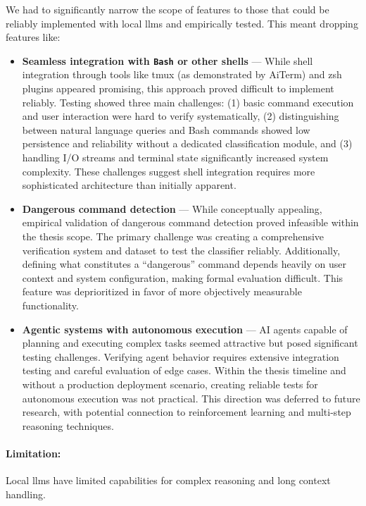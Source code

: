 We had to significantly narrow the scope of features to those that could be
reliably implemented with local \glspl{llm} and empirically tested. This meant
dropping features like:
\begin{itemize}
  \item \textbf{Seamless integration with \texttt{Bash} or other shells} ---
    While shell integration through tools like tmux (as demonstrated by AiTerm)
        and zsh plugins appeared promising, this approach proved difficult to
        implement reliably. Testing showed three main challenges: (1) basic
        command execution and user interaction were hard to verify
        systematically, (2) distinguishing between natural language queries and
        Bash commands showed low persistence and reliability without a dedicated
        classification module, and (3) handling I/O streams and terminal state
        significantly increased system complexity. These challenges suggest
        shell integration requires more sophisticated architecture than
        initially apparent.

  \item \textbf{Dangerous command detection} --- While conceptually appealing,
    empirical validation of dangerous command detection proved infeasible within
        the thesis scope. The primary challenge was creating a comprehensive
        verification system and dataset to test the classifier reliably.
        Additionally, defining what constitutes a ``dangerous'' command depends
        heavily on user context and system configuration, making formal
        evaluation difficult. This feature was deprioritized in favor of more
        objectively measurable functionality.

  \item \textbf{Agentic systems with autonomous execution} --- AI agents capable
    of planning and executing complex tasks seemed attractive but posed
        significant testing challenges. Verifying agent behavior requires
        extensive integration testing and careful evaluation of edge cases.
        Within the thesis timeline and without a production deployment scenario,
        creating reliable tests for autonomous execution was not practical. This
        direction was deferred to future research, with potential connection to
        reinforcement learning and multi-step reasoning techniques.
\end{itemize}

\paragraph{Limitation:} Local \glspl{llm} have limited capabilities for complex
reasoning and long context handling.

